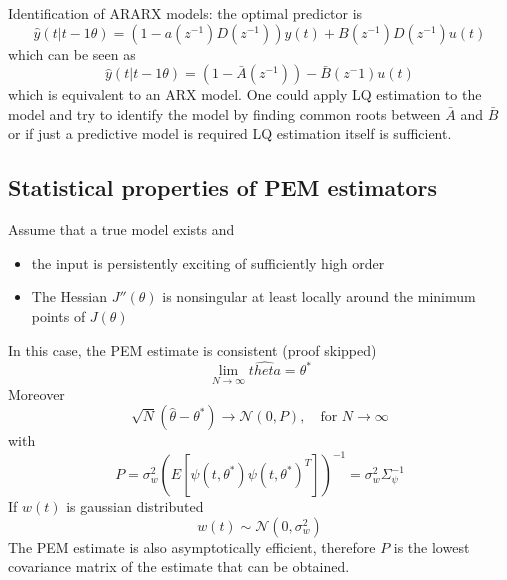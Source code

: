 \documentclass{book}
\begin{document}
Identification of ARARX models: the optimal predictor is
\[
    \hat{y}(t|t-1\theta)=(1-a(z^{-1})D(z^{-1}))y(t)+B(z^{-1})D(z^{-1})u(t)
\]
which can be seen as
\[
    \hat{y}(t|t-1\theta)=(1-\bar{A}(z^{-1}))-\bar{B}(z^-1)u(t)
\]
which is equivalent to an ARX model. One could apply LQ estimation to the model and try to identify the model by finding common roots between $\bar{A}$ and $\bar{B}$ or if just a predictive model is required LQ estimation itself is sufficient.
\subsection{Statistical properties of PEM estimators}
Assume that a true model exists and
\begin{itemize}
    \item the input is persistently exciting of sufficiently high order
    \item The Hessian $J''(\theta)$ is nonsingular at least locally around the minimum points of $J(\theta)$
\end{itemize}
In this case, the PEM estimate is consistent (proof skipped)
\[
    \lim_{N\to\infty} \hat{theta} = \theta^*
\]
Moreover
\[
    \sqrt{N}(\hat{\theta}-\theta^*) \to \mathcal{N}(0,P), \quad \text{for } N\to\infty
\]
with
\[
    P = \sigma_w^2 (E[\psi(t,\theta^*)\psi(t,\theta^*)^T])^{-1} = \sigma_w^2 \Sigma_{\psi}^{-1}
\]
If $w(t)$ is gaussian distributed
\[
    w(t)\sim \mathcal{N}(0,\sigma_w^2)
\]
The PEM estimate is also asymptotically efficient, therefore $P$ is the lowest covariance matrix of the estimate that can be obtained.
\end{document}
